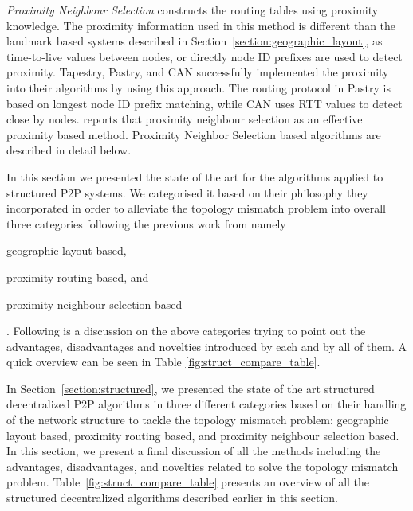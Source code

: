 \emph{Proximity Neighbour Selection} constructs the routing tables using
proximity knowledge. The proximity information used in this method is different
than the landmark based systems described in
Section~\ref{section:geographic_layout}, as time-to-live values between nodes,
or directly node ID prefixes are used to detect proximity. Tapestry, Pastry, and
CAN successfully implemented the proximity into their algorithms by using this
approach. The routing protocol in Pastry is based on longest node ID prefix
matching, while CAN uses RTT values to detect close by nodes.
\cite{castro_proximityp2p_2002} reports that proximity neighbour selection as an
effective proximity based method. Proximity Neighbor Selection based algorithms
are described in detail below.














In this section we presented the state of the art for the algorithms applied to
structured P2P systems. We categorised it based on their philosophy they
incorporated in order to alleviate the topology mismatch problem into overall
three categories following the previous work from
\cite{castro_proximitydht_2002,castro_topawareroute_2002,ratnasamy_openq_2002}
namely
\begin{inparaenum}
  \item geographic-layout-based,
  \item proximity-routing-based, and
  \item proximity neighbour selection based
\end{inparaenum}
. Following is a discussion on the above categories trying to point out the
advantages, disadvantages and novelties introduced by each and by all of them.
A quick overview can be seen in Table \ref{fig:struct_compare_table}.

In Section~\ref{section:structured}, we presented the state of the art
structured decentralized P2P algorithms in three different categories based on
their handling of the network structure to tackle the topology mismatch problem:
geographic layout based, proximity routing based, and proximity neighbour
selection based. In this section, we present a final discussion of all the
methods including the advantages, disadvantages, and novelties related to solve
the topology mismatch problem. Table~\ref{fig:struct_compare_table} presents an
overview of all the structured decentralized algorithms described earlier in
this section.

